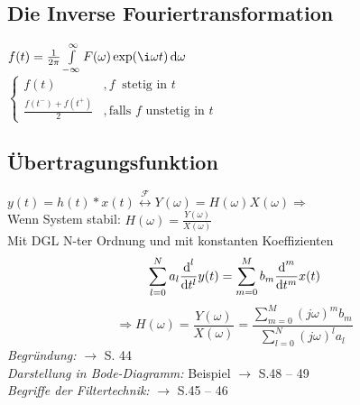 \documentclass[german]{latex4ei/latex4ei_sheet}
\renewcommand{\diff}{\mathop{}\!\mathrm{\vphantom( d}}
\begin{document}
\begin{minipage}{\columnwidth}
\begin{sectionbox}
	\subsection*{Die Inverse Fouriertransformation}
	$f(t) = \frac{1}{2\pi} \int\limits_{-\infty}^\infty F(\omega) \exp(\i \omega t) \diff \omega$\\
	$\begin{cases} f(t) & ,f\ \text{ stetig in }t \\ \frac{f(t^-) + f(t^+)}{2} & ,\text{falls } f\text{ unstetig in }t \end{cases}$
	
	\subsection*{Übertragungsfunktion}
	$\boxed{y(t) = h(t) \ast x(t) \stackrel{\mathcal{F}}{\longleftrightarrow} Y(\omega) = H(\omega) X(\omega)} \Rightarrow$\\
	Wenn System stabil:	$\boxed{H(\omega) = \frac{Y(\omega)}{X(\omega)}}$\\
	Mit DGL N-ter Ordnung und mit konstanten Koeffizienten
	\[\sum\limits_{l = 0}^{N}{a_l \frac{\diff^l}{\diff t^l} y(t)} = \sum\limits_{m = 0}^{M}{b_m \frac{\diff^m}{\diff t^m} x(t)}\]
	\[\Rightarrow \boxed{H(\omega) = \frac{Y(\omega)}{X(\omega)} = \frac{\sum\limits_{m = 0}^{M}{(j\omega)^m b_m}}{\sum\limits_{l = 0}^{N}{(j\omega)^l a_l}}}\]
	\emph{Begründung:} $\rightarrow$ S. 44\\
	\emph{Darstellung in Bode-Diagramm:} Beispiel $\rightarrow$ S.48 -- 49\\
	\emph{Begriffe der Filtertechnik:} $\rightarrow$ S.45 -- 46
\end{sectionbox}
\end{minipage}
	
\end{document}
